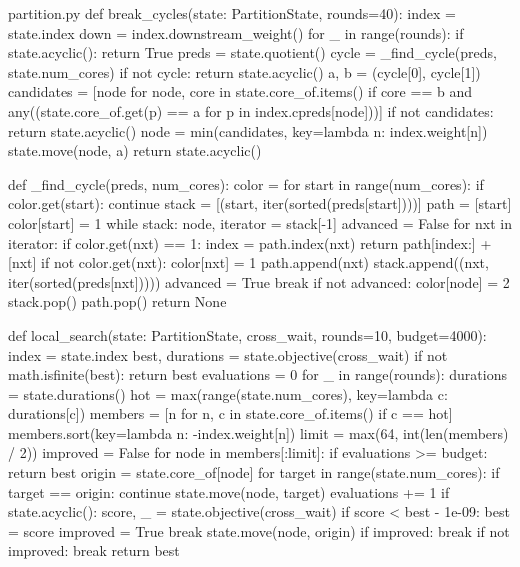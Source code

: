 \begin{Python}{partition.py}
def break_cycles(state: PartitionState, rounds=40):
    index = state.index
    down = index.downstream_weight()
    for _ in range(rounds):
        if state.acyclic():
            return True
        preds = state.quotient()
        cycle = _find_cycle(preds, state.num_cores)
        if not cycle:
            return state.acyclic()
        a, b = (cycle[0], cycle[1])
        candidates = [node for node, core in state.core_of.items() if core == b and any((state.core_of.get(p) == a for p in index.cpreds[node]))]
        if not candidates:
            return state.acyclic()
        node = min(candidates, key=lambda n: index.weight[n])
        state.move(node, a)
    return state.acyclic()

def _find_cycle(preds, num_cores):
    color = {}
    for start in range(num_cores):
        if color.get(start):
            continue
        stack = [(start, iter(sorted(preds[start])))]
        path = [start]
        color[start] = 1
        while stack:
            node, iterator = stack[-1]
            advanced = False
            for nxt in iterator:
                if color.get(nxt) == 1:
                    index = path.index(nxt)
                    return path[index:] + [nxt]
                if not color.get(nxt):
                    color[nxt] = 1
                    path.append(nxt)
                    stack.append((nxt, iter(sorted(preds[nxt]))))
                    advanced = True
                    break
            if not advanced:
                color[node] = 2
                stack.pop()
                path.pop()
    return None

def local_search(state: PartitionState, cross_wait, rounds=10, budget=4000):
    index = state.index
    best, durations = state.objective(cross_wait)
    if not math.isfinite(best):
        return best
    evaluations = 0
    for _ in range(rounds):
        durations = state.durations()
        hot = max(range(state.num_cores), key=lambda c: durations[c])
        members = [n for n, c in state.core_of.items() if c == hot]
        members.sort(key=lambda n: -index.weight[n])
        limit = max(64, int(len(members) / 2))
        improved = False
        for node in members[:limit]:
            if evaluations >= budget:
                return best
            origin = state.core_of[node]
            for target in range(state.num_cores):
                if target == origin:
                    continue
                state.move(node, target)
                evaluations += 1
                if state.acyclic():
                    score, _ = state.objective(cross_wait)
                    if score < best - 1e-09:
                        best = score
                        improved = True
                        break
                state.move(node, origin)
            if improved:
                break
        if not improved:
            break
    return best


\end{Python}
